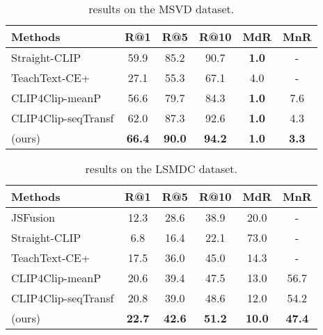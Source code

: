 \documentclass[10pt,twocolumn,letterpaper]{article}
\begin{document}
\begin{table}[h]
\footnotesize
\setlength{\tabcolsep}{2pt}
\centering
\begin{tabular}{l c c c c c} 
\hline 
Methods & R@1  & R@5  & R@10  & MdR  & MnR  \\
\hline
Straight-CLIP \cite{portillo2021straightforward} & 59.9 & 85.2 & 90.7 & \textbf{1.0} & - \\
TeachText-CE+ \cite{croitoru2021teachtext} & 27.1 & 55.3 & 67.1 & 4.0 & - \\ 
CLIP4Clip-meanP \cite{luo2021clip4clip} & 56.6 & 79.7 & 84.3 & \textbf{1.0} & 7.6 \\
CLIP4Clip-seqTransf \cite{luo2021clip4clip} & 62.0 & 87.3 & 92.6 & \textbf{1.0} & 4.3 \\
\ModelName{} (ours) & \textbf{66.4} & \textbf{90.0} & \textbf{94.2} & \textbf{1.0} & \textbf{3.3} \\
\hline
\end{tabular}
\vspace{-0.2cm}
\caption{ results on the MSVD dataset.}
\label{tab:msvd-res-v2t}
\end{table}

\begin{table}[h]
\footnotesize
\setlength{\tabcolsep}{2pt}
\centering
\begin{tabular}{l c c c c c} 
\hline 
Methods & R@1  & R@5  & R@10  & MdR  & MnR  \\
\hline
JSFusion \cite{yu2018joint} & 12.3 & 28.6 & 38.9 & 20.0 & - \\
Straight-CLIP \cite{portillo2021straightforward} & 6.8 & 16.4 & 22.1 & 73.0 & - \\
TeachText-CE+ \cite{croitoru2021teachtext} & 17.5 & 36.0 & 45.0 & 14.3 & - \\
CLIP4Clip-meanP \cite{luo2021clip4clip} & 20.6 & 39.4 & 47.5 & 13.0 & 56.7 \\
CLIP4Clip-seqTransf \cite{luo2021clip4clip} & 20.8 & 39.0 & 48.6 & 12.0 & 54.2 \\
\ModelName{} (ours) & \textbf{22.7} & \textbf{42.6} & \textbf{51.2} & \textbf{10.0} & \textbf{47.4} \\
\hline
\end{tabular}
\vspace{-0.2cm}
\caption{ results on the LSMDC dataset.}
\label{tab:lsmdc-res-v2t}
\end{table}
\end{document}
